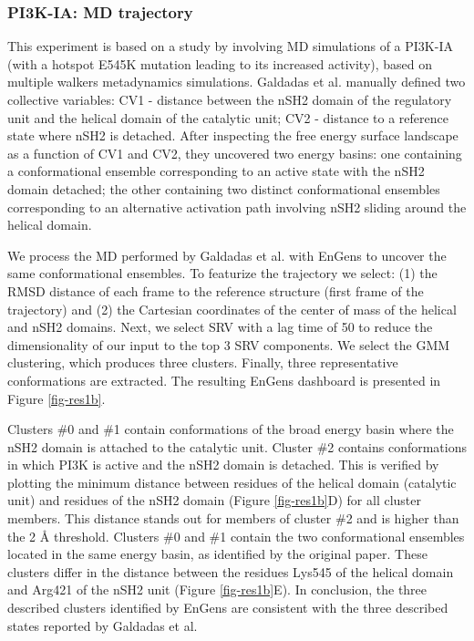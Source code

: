 \documentclass[numsec,webpdf,contemporary,large]{oup-authoring-template}
\theoremstyle{thmstyleone}%
\theoremstyle{thmstyletwo}%
\theoremstyle{thmstylethree}%
\begin{document}
\subsubsection{PI3K-IA: MD trajectory}


This experiment is based on a study by \cite{galdadas_unravelling_2020} involving MD simulations of a PI3K-IA (with a hotspot E545K mutation leading to its increased activity), based on multiple walkers metadynamics simulations. Galdadas et al. manually defined two collective variables: CV1 - distance between the nSH2 domain of the regulatory unit and the helical domain of the catalytic unit; CV2 - distance to a reference state where nSH2 is detached. After inspecting the free energy surface landscape as a function of CV1 and CV2, they uncovered two energy basins: one containing a conformational ensemble corresponding to an active state with the nSH2 domain detached; the other containing two distinct conformational ensembles corresponding to an alternative activation path involving nSH2 sliding around the helical domain.

We process the MD performed by Galdadas et al. with EnGens to uncover the same conformational ensembles. To featurize the trajectory we select: (1) the RMSD distance of each frame to the reference structure (first frame of the trajectory) and (2) the Cartesian coordinates of the center of mass of the helical and nSH2 domains. Next, we select SRV with a lag time of 50 to reduce the dimensionality of our input to the top 3 SRV components. We select the GMM clustering, which produces three clusters. Finally, three representative conformations are extracted. The resulting EnGens dashboard is presented in Figure \ref{fig-res1b}. 

Clusters \#0 and \#1 contain conformations of the broad energy basin where the nSH2 domain is attached to the catalytic unit. Cluster \#2 contains conformations in which PI3K is active and the nSH2 domain is detached. This is verified by plotting the minimum distance between residues of the helical domain (catalytic unit) and residues of the nSH2 domain (Figure \ref{fig-res1b}D) for all cluster members. This distance stands out for members of cluster \#2 and is higher than the 2 Å threshold.  Clusters \#0 and \#1 contain the two conformational ensembles located in the same energy basin, as identified by the original paper. These clusters differ in the distance between the residues Lys545 of the helical domain and Arg421 of the nSH2 unit (Figure \ref{fig-res1b}E).  In conclusion, the three described clusters identified by EnGens are consistent with the three described states reported by Galdadas et al.
 
\end{document}
